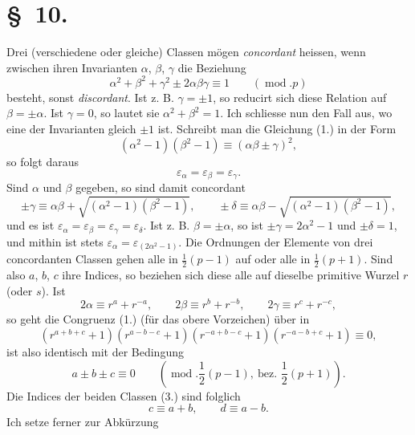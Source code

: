 \documentclass[11pt]{article}
\begin{document}
\section*{\S~10.}

Drei (verschiedene oder gleiche) Classen mögen \emph{concordant} heissen, wenn zwischen ihren Invarianten $\alpha$, $\beta$, $\gamma$ die Beziehung
\begin{equation*}\tag{1.}
\alpha^2+\beta^2+\gamma^2\pm2\alpha\beta\gamma\equiv1\qquad(\operatorname{mod}.p)
\end{equation*}
besteht, sonst \emph{discordant}. Ist z. B. $\gamma=\pm1$, so reducirt sich diese Relation auf $\beta=\pm\alpha$. Ist $\gamma=0$, so lautet sie $\alpha^2+\beta^2=1$. Ich schliesse nun den Fall aus, wo eine der Invarianten gleich $\pm1$ ist. Schreibt man die Gleichung (1.) in der Form
\[
(\alpha^2-1)(\beta^2-1)\equiv(\alpha\beta\pm\gamma)^2,
\]
so folgt daraus
\begin{equation*}\tag{2.}
\varepsilon_\alpha=\varepsilon_\beta=\varepsilon_\gamma.
\end{equation*}
Sind $\alpha$ und $\beta$ gegeben, so sind damit concordant
\begin{equation*}\tag{3.}
\pm\gamma\equiv\alpha\beta+\sqrt{(\alpha^2-1)(\beta^2-1)},\qquad
\pm\delta\equiv\alpha\beta-\sqrt{(\alpha^2-1)(\beta^2-1)},
\end{equation*}
und es ist $\varepsilon_\alpha=\varepsilon_\beta=\varepsilon_\gamma=\varepsilon_\delta$. Ist z. B. $\beta=\pm\alpha$, so ist $\pm\gamma=2\alpha^2-1$ und $\pm\delta=1$, und mithin ist stets $\varepsilon_\alpha=\varepsilon_{(2\alpha^2-1)}$. Die Ordnungen der Elemente von drei concordanten Classen gehen alle in $\frac12(p-1)$ auf oder alle in $\frac12(p+1)$. Sind also $a$, $b$, $c$ ihre Indices, so beziehen sich diese alle auf dieselbe primitive Wurzel $r$ (oder $s$). Ist
\[
2\alpha\equiv r^a+r^{-a},\qquad
2\beta\equiv r^b+r^{-b},\qquad
2\gamma\equiv r^c+r^{-c},
\]
so geht die Congruenz (1.) (für das obere Vorzeichen) über in
\[
(r^{a+b+c}+1)(r^{a-b-c}+1)(r^{-a+b-c}+1)(r^{-a-b+c}+1)\equiv0,
\]
ist also identisch mit der Bedingung
\begin{equation*}\tag{4.}
a\pm b\pm c\equiv0\qquad\left(\operatorname{mod}.\frac12(p-1),\ \text{bez. }\frac12(p+1)\right).
\end{equation*}
Die Indices der beiden Classen (3.) sind folglich
\begin{equation*}\tag{5.}
c\equiv a+b,\qquad d\equiv a-b.
\end{equation*}
Ich setze ferner zur Abkürzung
\end{document}
